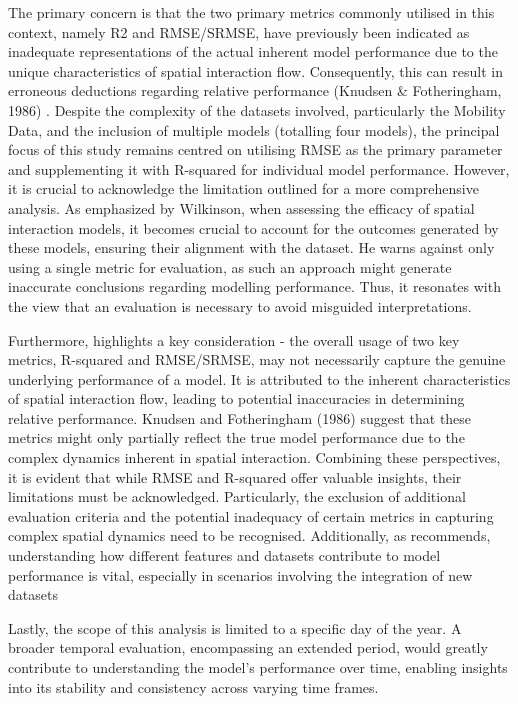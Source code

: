         The primary concern is that the two primary metrics commonly utilised in this context, namely R2 and RMSE/SRMSE, have previously been indicated as inadequate representations of the actual inherent model performance due to the unique characteristics of spatial interaction flow. Consequently, this can result in erroneous deductions regarding relative performance (Knudsen \& Fotheringham, 1986) \cite{wilkinsonSpatialInteractionModels2023}. Despite the complexity of the datasets involved, particularly the Mobility Data, and the inclusion of multiple models (totalling four models), the principal focus of this study remains centred on utilising RMSE as the primary parameter and supplementing it with R-squared for individual model performance. However, it is crucial to acknowledge the limitation \cite{wilkinsonSpatialInteractionModels2023} outlined for a more comprehensive analysis. As emphasized by Wilkinson, when assessing the efficacy of spatial interaction models, it becomes crucial to account for the outcomes generated by these models, ensuring their alignment with the dataset. He warns against only using a single metric for evaluation, as such an approach might generate inaccurate conclusions regarding modelling performance. Thus, it resonates with the view that an evaluation is necessary to avoid misguided interpretations.
        
        Furthermore, \cite{wilkinsonSpatialInteractionModels2023, lucaSurveyDeepLearning2021} highlights a key consideration - the overall usage of two key metrics, R-squared and RMSE/SRMSE, may not necessarily capture the genuine underlying performance of a model. It is attributed to the inherent characteristics of spatial interaction flow, leading to potential inaccuracies in determining relative performance. Knudsen and Fotheringham (1986) suggest that these metrics might only partially reflect the true model performance due to the complex dynamics inherent in spatial interaction.  Combining these perspectives, it is evident that while RMSE and R-squared offer valuable insights, their limitations must be acknowledged. Particularly, the exclusion of additional evaluation criteria and the potential inadequacy of certain metrics in capturing complex spatial dynamics need to be recognised. Additionally, as \cite{wilkinsonSpatialInteractionModels2023} recommends, understanding how different features and datasets contribute to model performance is vital, especially in scenarios involving the integration of new datasets
        
        Lastly, the scope of this analysis is limited to a specific day of the year. A broader temporal evaluation, encompassing an extended period, would greatly contribute to understanding the model's performance over time, enabling insights into its stability and consistency across varying time frames.








